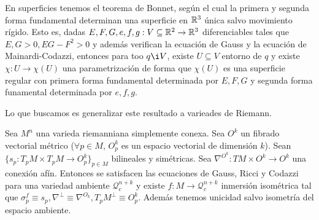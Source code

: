 \documentclass[GSR.tex]{subfiles}
\begin{document}
En superficies tenemos el teorema de Bonnet, según el cual la primera y segunda forma fundamental determinan una superficie en $\mathbb{R}^3$ única salvo movimiento rígido. Esto es, dadas $E,F,G,e,f,g:V\subseteq\mathbb{R}^2\to\mathbb{R}^3$ diferenciables tales que $E,G>0, EG-F^2>0$ y además verifican la ecuación de Gauss y la ecuación de Mainardi-Codazzi, entonces para too $q\i V$, existe $U\subseteq V$ entorno de $q$ y existe $\chi:U\to\chi(U)$ una parametrización de forma que $\chi(U)$ es una superficie regular con primera forma fundamental determinada por $E,F,G$ y segunda forma funamental determinada por $e,f,g$. 

Lo que buscamos es generalizar este resultado a varieades de Riemann. 

\begin{teorema}
Sea $M^{n}$ una varieda riemanniana simplemente conexa. Sea $O^k$ un fibrado vectorial métrico ($\forall p\in M$, $O^k_p$ es un espacio vectorial de dimensión $k$). Sean $\{s_p:T_pM\times T_pM\to O_p^k\}_{p\in M}$ bilineales y simétricas. Sea $\nabla^{O^k}:TM\times O^k\to O^k$ una conexión afín. Entonces se satisfacen las ecuaciones de Gauss, Ricci y Codazzi para una variedad ambiente $\mathcal{Q}_c^{n+k}$ y existe $f:M\to \mathcal{Q}_c^{n+k}$ inmersión isométrica tal que $\sigma_p^f\equiv s_p, \nabla^\perp\equiv\nabla^{O_k}, T_pM^\perp\equiv O_p^k$. Además tenemos unicidad salvo isometría del espacio ambiente. 
\end{teorema}
\end{document}
